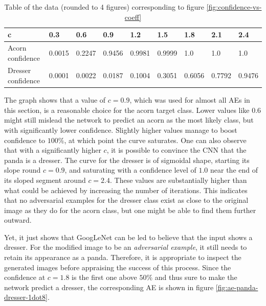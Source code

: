 \documentclass[11pt, a4paper]{article}
\begin{document}
\begin{table}[h!tb]
	\begin{tabular}{|l|llllllll|}
		\hline
		c & 0.3 & 0.6 & 0.9 & 1.2 & 1.5 & 1.8 & 2.1 & 2.4 \\
		\hline
		Acorn confidence & 0.0015 & 0.2247 & 0.9456 & 0.9981 & 0.9999 & 1.0 & 1.0 & 1.0 \\
		Dresser confidence & 0.0001 & 0.0022 & 0.0187 & 0.1004 & 0.3051 & 0.6056 & 0.7792 & 0.9476 \\
		\hline
	\end{tabular}
	\caption[Final network confidence w.r.t adaption strength coefficient]{Table of the data (rounded to 4 figures) corresponding to figure \ref{fig:confidence-vs-coeff}}
	\label{tab:confidence-vs-coeff}
\end{table}

The graph shows that a value of $c = 0.9$, which was used for almost all AEs in this section, is a reasonable choice for the acorn target class. Lower values like 0.6 might still mislead the network to predict an acorn as the most likely class, but with significantly lower confidence. Slightly higher values manage to boost confidence to $100\%$, at which point the curve saturates. One can also observe that with a significantly higher $c$, it is possible to convince the CNN that the panda is a dresser. The curve for the dresser is of sigmoidal shape, starting its slope round $c = 0.9$, and saturating with a confidence level of $1.0$ near the end of its sloped segment around $c = 2.4$. These values are substantially higher than what could be achieved by increasing the number of iterations. This indicates that no adversarial examples for the dresser class exist as close to the original image as they do for the acorn class, but one might be able to find them further outward.

Yet, it just shows that GoogLeNet can be led to believe that the input shows a dresser. For the modified image to be an \emph{adversarial example}, it still needs to retain its appearance as a panda. Therefore, it is appropriate to inspect the generated images before appraising the success of this process. Since the confidence at $c = 1.8$ is the first one above $50\%$ and thus sure to make the network predict a dresser, the corresponding AE is shown in figure \ref{fig:ae-panda-dresser-1dot8}.
\end{document}
